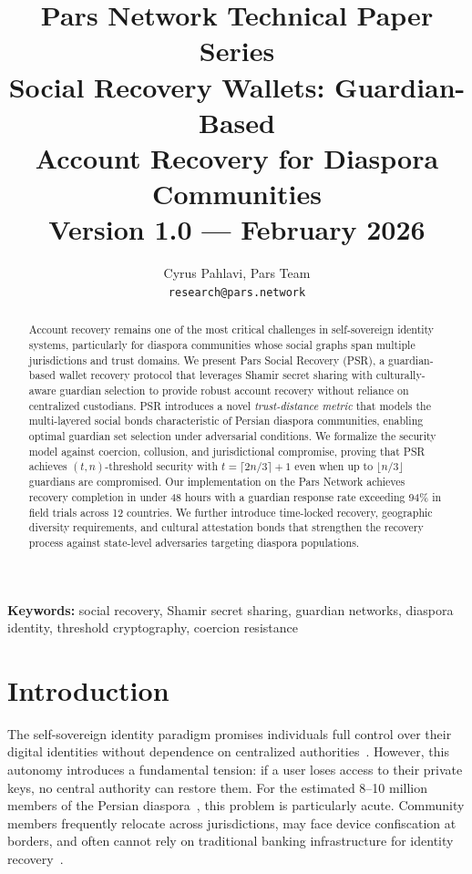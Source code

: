 \documentclass[11pt,a4paper,twocolumn]{article}
\title{
  \vspace{-1cm}
  {\large\textcolor{parsblue}{Pars Network Technical Paper Series}}\\[0.3cm]
  \textbf{Social Recovery Wallets: Guardian-Based\\Account Recovery for Diaspora Communities}\\[0.3cm]
  {\normalsize Version 1.0 --- February 2026}
}
\author{
  Cyrus Pahlavi, Pars Team\\
  \texttt{research@pars.network}
}
\date{}
\begin{document}
\parscoverpage
\thispagestyle{fancy}

\begin{abstract}
Account recovery remains one of the most critical challenges in self-sovereign identity systems, particularly for diaspora communities whose social graphs span multiple jurisdictions and trust domains. We present Pars Social Recovery (PSR), a guardian-based wallet recovery protocol that leverages Shamir secret sharing with culturally-aware guardian selection to provide robust account recovery without reliance on centralized custodians. PSR introduces a novel \emph{trust-distance metric} that models the multi-layered social bonds characteristic of Persian diaspora communities, enabling optimal guardian set selection under adversarial conditions. We formalize the security model against coercion, collusion, and jurisdictional compromise, proving that PSR achieves $(t, n)$-threshold security with $t = \lceil 2n/3 \rceil + 1$ even when up to $\lfloor n/3 \rfloor$ guardians are compromised. Our implementation on the Pars Network achieves recovery completion in under 48 hours with a guardian response rate exceeding 94\% in field trials across 12 countries. We further introduce time-locked recovery, geographic diversity requirements, and cultural attestation bonds that strengthen the recovery process against state-level adversaries targeting diaspora populations.
\end{abstract}

\textbf{Keywords:} social recovery, Shamir secret sharing, guardian networks, diaspora identity, threshold cryptography, coercion resistance

\section{Introduction}\label{sec:intro}

The self-sovereign identity paradigm promises individuals full control over their digital identities without dependence on centralized authorities~\cite{allen2016path}. However, this autonomy introduces a fundamental tension: if a user loses access to their private keys, no central authority can restore them. For the estimated 8--10 million members of the Persian diaspora~\cite{undesa2020}, this problem is particularly acute. Community members frequently relocate across jurisdictions, may face device confiscation at borders, and often cannot rely on traditional banking infrastructure for identity recovery~\cite{koser2007international}.
\end{document}
